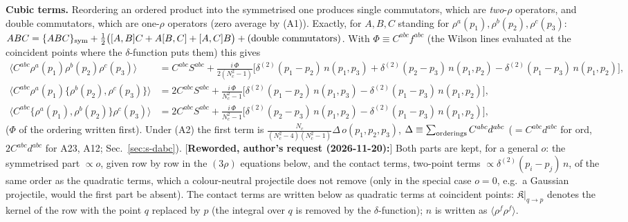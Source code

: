 {\noindent\textbf{Cubic terms.} Reordering an ordered product into the symmetrised one produces single commutators, which are \emph{two}-$\rho$ operators, and double commutators, which are one-$\rho$ operators (zero average by (A1)). Exactly, for $A,B,C$ standing for $\rho^{a}(p_{1}),\rho^{b}(p_{2}),\rho^{c}(p_{3})$: $ABC=\{ABC\}_{\rm sym}+\frac12\big([A,B]C+A[B,C]+[A,C]B\big)+(\text{double commutators})$. With $\Phi\equiv C^{abc}f^{abc}$ (the Wilson lines evaluated at the coincident points where the $\delta$-function puts them) this gives
\begin{align}
\langle C^{abc}\rho^{a}(p_{1})\rho^{b}(p_{2})\rho^{c}(p_{3})\rangle&=C^{abc}S^{abc}+\frac{i\,\Phi}{2(N_{c}^{2}-1)}\Big[\delta^{(2)}(p_{1}-p_{2})\,n(p_{1},p_{3})+\delta^{(2)}(p_{2}-p_{3})\,n(p_{1},p_{2})-\delta^{(2)}(p_{1}-p_{3})\,n(p_{1},p_{2})\Big],\label{eq:s-ord}\\
\langle C^{abc}\rho^{a}(p_{1})\{\rho^{b}(p_{2}),\rho^{c}(p_{3})\}\rangle&=2C^{abc}S^{abc}+\frac{i\,\Phi}{N_{c}^{2}-1}\Big[\delta^{(2)}(p_{1}-p_{2})\,n(p_{1},p_{3})-\delta^{(2)}(p_{1}-p_{3})\,n(p_{1},p_{2})\Big],\label{eq:s-a23}\\
\langle C^{abc}\{\rho^{a}(p_{1}),\rho^{b}(p_{2})\}\rho^{c}(p_{3})\rangle&=2C^{abc}S^{abc}+\frac{i\,\Phi}{N_{c}^{2}-1}\Big[\delta^{(2)}(p_{2}-p_{3})\,n(p_{1},p_{2})-\delta^{(2)}(p_{1}-p_{3})\,n(p_{1},p_{2})\Big],\label{eq:s-a12}
\end{align}
($\Phi$ of the ordering written first). Under (A2) the first term is $\frac{N_{c}}{(N_{c}^{2}-4)(N_{c}^{2}-1)}\Delta\,o(p_{1},p_{2},p_{3})$, $\Delta\equiv\sum_{\rm orderings}C^{abc}d^{abc}$ ($=C^{abc}d^{abc}$ for ord, $2C^{abc}d^{abc}$ for A23, A12; Sec.~\ref{sec:s-dabc}). [\textbf{Reworded, author's request (2026-11-20):}] Both parts are kept, for a general $o$: the symmetrised part $\propto o$, given row by row in the $(3\rho)$ equations below, and the contact terms, two-point terms $\propto\delta^{(2)}(p_{i}-p_{j})\,n$, of the same order as the quadratic terms, which a colour-neutral projectile does not remove (only in the special case $o=0$, e.g.\ a Gaussian projectile, would the first part be absent). The contact terms are written below as quadratic terms at coincident points: $\mathfrak{K}\big|_{q\to p}$ denotes the kernel of the row with the point $q$ replaced by $p$ (the integral over $q$ is removed by the $\delta$-function); $n$ is written as $\langle\rho^{f}\rho^{f}\rangle$.

}
